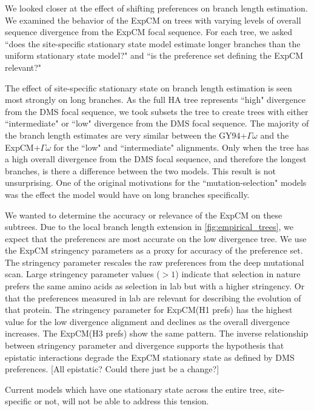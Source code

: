 \documentclass[11pt]{article}
\newcommand\skhcomment[1]{{\color{cyan}[#1]}}
\begin{document}
We looked closer at the effect of shifting preferences on branch length estimation. 
We examined the behavior of the ExpCM on trees with varying levels of overall sequence divergence from the ExpCM focal sequence. 
For each tree, we asked ``does the site-specific stationary state model estimate longer branches than the uniform stationary state model?" and ``is the preference set defining the ExpCM relevant?"

The effect of site-specific stationary state on branch length estimation is seen most strongly on long branches. 
As the full HA tree represents ``high" divergence from the DMS focal sequence, we took subsets the tree to create trees with either ``intermediate" or ``low" divergence from the DMS focal sequence. 
The majority of the branch length estimates are very similar between the GY94+$\Gamma\omega$ and the ExpCM+$\Gamma\omega$ for the ``low" and ``intermediate" alignments. 
Only when the tree has a high overall divergence from the DMS focal sequence, and therefore the longest branches, is there a difference between the two models. 
This result is not unsurprising. 
One of the original motivations for the ``mutation-selection" models was the effect the model would have on long branches specifically. 

We wanted to determine the accuracy or relevance of the ExpCM on these subtrees. 
Due to the local branch length extension in \ref{fig:empirical_trees}, we expect that the preferences are most accurate on the low divergence tree. We use the ExpCM stringency parameters as a proxy for accuracy of the preference set. 
The stringency parameter rescales the raw preferences from the deep mutational scan. 
Large stringency parameter values ($>1$) indicate that selection in nature prefers the same amino acids as selection in lab but with a higher stringency.
Or that the preferences measured in lab are relevant for describing the evolution of that protein. 
The stringency parameter for ExpCM(H1 prefs) has the highest value for the low divergence alignment and declines as the overall divergence increases. 
The ExpCM(H3 prefs) show the same pattern. 
The inverse relationship between stringency parameter and divergence supports the hypothesis that epistatic interactions degrade the ExpCM stationary state as defined by DMS preferences. 
\skhcomment{All epistatic? Could there just be a change?}

Current models which have one stationary state across the entire tree, site-specific or not, will not be able to address this tension. 
\end{document}
